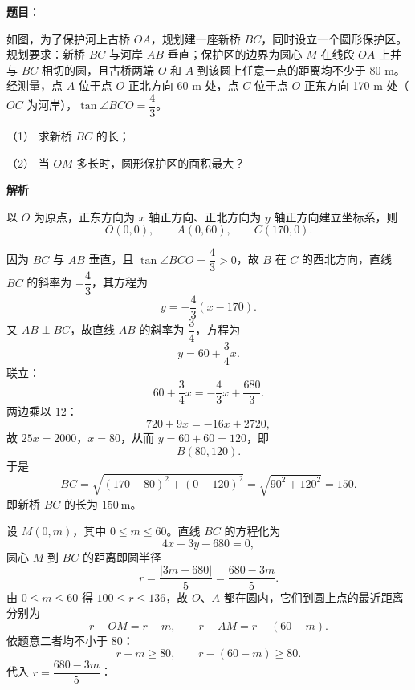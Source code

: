 \begin{answer}

\textbf{题目}：

如图，为了保护河上古桥 $OA$，规划建一座新桥 $BC$，同时设立一个圆形保护区。规划要求：新桥 $BC$ 与河岸 $AB$ 垂直；保护区的边界为圆心 $M$ 在线段 $OA$ 上并与 $BC$ 相切的圆，且古桥两端 $O$ 和 $A$ 到该圆上任意一点的距离均不少于 80 m。经测量，点 $A$ 位于点 $O$ 正北方向 60 m 处，点 $C$ 位于点 $O$ 正东方向 170 m 处（$OC$ 为河岸），$\tan\angle BCO=\dfrac43$。

（1） 求新桥 $BC$ 的长；

（2） 当 $OM$ 多长时，圆形保护区的面积最大？
\nopagebreak[4]
\begin{center}\end{center}
\nopagebreak[4]
\textbf{解析}

以 $O$ 为原点，正东方向为 $x$ 轴正方向、正北方向为 $y$ 轴正方向建立坐标系，则
\nopagebreak[4]
\[O(0,0),\qquad A(0,60),\qquad C(170,0).\]


因为 $BC$ 与 $AB$ 垂直，且 $\tan\angle BCO=\dfrac43>0$，故 $B$ 在 $C$ 的西北方向，直线 $BC$ 的斜率为 $-\dfrac43$，其方程为
\nopagebreak[4]
\[y=-\frac43(x-170).\]
又 $AB\perp BC$，故直线 $AB$ 的斜率为 $\dfrac34$，方程为
\nopagebreak[4]
\[y=60+\frac34x.\]
联立：
\nopagebreak[4]
\[60+\frac34x=-\frac43x+\frac{680}3.\]
两边乘以 $12$：
\nopagebreak[4]
\[720+9x=-16x+2720,\]
故 $25x=2000$，$x=80$，从而 $y=60+60=120$，即
\nopagebreak[4]
\[B(80,120).\]
于是
\nopagebreak[4]
\[BC=\sqrt{(170-80)^2+(0-120)^2}=\sqrt{90^2+120^2}=150.\]
即新桥 $BC$ 的长为 $150\ \mathrm m$。


设 $M(0,m)$，其中 $0\leqslant m\leqslant60$。直线 $BC$ 的方程化为
\nopagebreak[4]
\[4x+3y-680=0,\]
圆心 $M$ 到 $BC$ 的距离即圆半径
\nopagebreak[4]
\[r=\frac{|3m-680|}{5}=\frac{680-3m}5.\]
由 $0\leqslant m\leqslant60$ 得 $100\leqslant r\leqslant136$，故 $O$、$A$ 都在圆内，它们到圆上点的最近距离分别为
\nopagebreak[4]
\[r-OM=r-m,\qquad r-AM=r-(60-m).\]
依题意二者均不小于 $80$：
\nopagebreak[4]
\[r-m\geqslant80,\qquad r-(60-m)\geqslant80.\]
代入 $r=\dfrac{680-3m}5$：


\end{answer}
